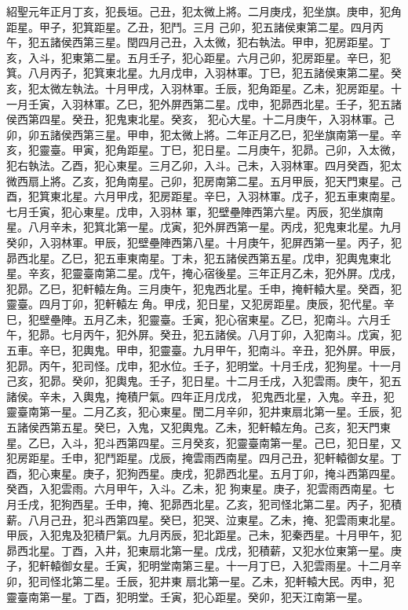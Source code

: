 \begin{pinyinscope}
 紹聖元年正月丁亥，犯長垣。己丑，犯太微上將。二月庚戌，犯坐旗。庚申，犯角距星。甲子，犯箕距星。乙丑，犯鬥。三月
 己卯，犯五諸侯東第二星。四月丙午，犯五諸侯西第三星。閏四月己丑，入太微，犯右執法。甲申，犯房距星。丁亥，入斗，犯東第二星。五月壬子，犯心距星。六月己卯，犯房距星。辛巳，犯箕。八月丙子，犯箕東北星。九月戊申，入羽林軍。丁巳，犯五諸侯東第二星。癸亥，犯太微左執法。十月甲戌，入羽林軍。壬辰，犯角距星。乙未，犯房距星。十一月壬寅，入羽林軍。乙巳，犯外屏西第二星。戊申，犯昴西北星。壬子，犯五諸侯西第四星。癸丑，犯鬼東北星。癸亥，
 犯心大星。十二月庚午，入羽林軍。己卯，卯五諸侯西第三星。甲申，犯太微上將。二年正月乙巳，犯坐旗南第一星。辛亥，犯靈臺。甲寅，犯角距星。丁巳，犯日星。二月庚午，犯昴。己卯，入太微，犯右執法。乙酉，犯心東星。三月乙卯，入斗。己未，入羽林軍。四月癸酉，犯太微西扇上將。乙亥，犯角南星。己卯，犯房南第二星。五月甲辰，犯天門東星。己酉，犯箕東北星。六月甲戌，犯房距星。辛巳，入羽林軍。戊子，犯五車東南星。七月壬寅，犯心東星。戊申，入羽林
 軍，犯壁壘陣西第六星。丙辰，犯坐旗南星。八月辛未，犯箕北第一星。戊寅，犯外屏西第一星。丙戌，犯鬼東北星。九月癸卯，入羽林軍。甲辰，犯壁壘陣西第八星。十月庚午，犯屏西第一星。丙子，犯昴西北星。乙巳，犯五車東南星。丁未，犯五諸侯西第五星。戊申，犯輿鬼東北星。辛亥，犯靈臺南第二星。戊午，掩心宿後星。三年正月乙未，犯外屏。戊戌，犯昴。乙巳，犯軒轅左角。三月庚午，犯鬼西北星。壬申，掩軒轅大星。癸酉，犯靈臺。四月丁卯，犯軒轅左
 角。甲戌，犯日星，又犯房距星。庚辰，犯代星。辛巳，犯壁壘陣。五月乙未，犯靈臺。壬寅，犯心宿東星。乙巳，犯南斗。六月壬午，犯昴。七月丙午，犯外屏。癸丑，犯五諸侯。八月丁卯，入犯南斗。戊寅，犯五車。辛巳，犯輿鬼。甲申，犯靈臺。九月甲午，犯南斗。辛丑，犯外屏。甲辰，犯昴。丙午，犯司怪。戊申，犯水位。壬子，犯明堂。十月壬戌，犯狗星。十一月己亥，犯昴。癸卯，犯輿鬼。壬子，犯日星。十二月壬戌，入犯雲雨。庚午，犯五諸侯。辛未，入輿鬼，掩積尸氣。四年正月戊戌，
 犯鬼西北星，入鬼。辛丑，犯靈臺南第一星。二月乙亥，犯心東星。閏二月辛卯，犯井東扇北第一星。壬辰，犯五諸侯西第五星。癸巳，入鬼，又犯輿鬼。乙未，犯軒轅左角。己亥，犯天門東星。乙巳，入斗，犯斗西第四星。三月癸亥，犯靈臺南第一星。己巳，犯日星，又犯房距星。壬申，犯鬥距星。戊辰，掩雲雨西南星。四月己丑，犯軒轅御女星。丁酉，犯心東星。庚子，犯狗西星。庚戌，犯昴西北星。五月丁卯，掩斗西第四星。癸酉，入犯雲雨。六月甲午，入斗。乙未，犯
 狗東星。庚子，犯雲雨西南星。七月壬戌，犯狗西星。壬申，掩、犯昴西北星。乙亥，犯司怪北第二星。丙子，犯積薪。八月己丑，犯斗西第四星。癸巳，犯哭、泣東星。乙未，掩、犯雲雨東北星。甲辰，入犯鬼及犯積尸氣。九月丙辰，犯北距星。己未，犯秦西星。十月甲午，犯昴西北星。丁酉，入井，犯東扇北第一星。戊戌，犯積薪，又犯水位東第一星。庚子，犯軒轅御女星。壬寅，犯明堂南第三星。十一月丁巳，入犯雲雨星。十二月辛卯，犯司怪北第二星。壬辰，犯井東
 扇北第一星。乙未，犯軒轅大民。丙申，犯靈臺南第一星。丁酉，犯明堂。壬寅，犯心距星。癸卯，犯天江南第一星。




\end{pinyinscope}
